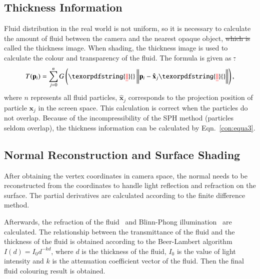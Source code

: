 \documentclass[times,twocolumn,final]{elsarticle}
\providecommand{\DIFaddtex}[1]{{\protect\color{blue}\uwave{#1}}} %
\providecommand{\DIFdeltex}[1]{{\protect\color{red}\sout{#1}}}                      %
\providecommand{\DIFaddbegin}{} %
\providecommand{\DIFaddend}{} %
\providecommand{\DIFdelbegin}{} %
\providecommand{\DIFdelend}{} %
\providecommand{\DIFadd}[1]{\texorpdfstring{\DIFaddtex{#1}}{#1}} %
\providecommand{\DIFdel}[1]{\texorpdfstring{\DIFdeltex{#1}}{}} %
\begin{document}
\subsection{Thickness Information}
Fluid distribution in the real world is not uniform, so it is necessary to calculate the amount of fluid between the camera and the nearest opaque object, \DIFdelbegin \DIFdel{which is }\DIFdelend called the thickness image. When shading, the thickness image is used to calculate the colour and transparency of the fluid\cite{ref:ref14}. The formula is given as \DIFdelbegin \DIFdel{:
}\DIFdelend \DIFaddbegin \DIFadd{follows:
}\DIFaddend \begin{equation}
    T(\mathbf{{p}}_i)=\sum_{j=0}^{n} G\left( \DIFdelbegin \DIFdel{\| }\DIFdelend \DIFaddbegin \left\| \DIFaddend \mathbf{{p}}_i - \mathbf{\hat{x}}_j \DIFdelbegin \DIFdel{\| }\DIFdelend \DIFaddbegin \right\| \DIFaddend \right), 
\label{con:equa3}
\end{equation}
where $n$ represents all fluid particles, $\mathbf{\hat{x}}_j$ corresponds to the projection position of particle $\mathbf{{x}}_j$ in the screen space. This calculation is correct when the particles do not overlap. Because of the incompressibility of the SPH method (particles seldom overlap), the thickness information can be calculated by Eqn.~\ref{con:equa3}.

\subsection{Normal Reconstruction and Surface Shading}
After obtaining the vertex coordinates in camera space, the normal needs to be reconstructed from the coordinates to handle light reflection and refraction on the surface. The partial derivatives are calculated according to the finite difference method.

Afterwards, the refraction of the fluid~\cite{ref:ref25} and Blinn-Phong illumination~\cite{ref:ref27} are calculated. The relationship between the transmittance of the fluid and the thickness of the fluid is obtained according to the Beer-Lambert algorithm\cite{ref:ref28} $I(d)=I_{0} d^{-k d}$, where $d$ is the thickness of the fluid, $I_0$ is the value of light intensity and $k$ is the attenuation coefficient vector of the fluid. Then the final fluid colouring result is obtained.
\end{document}

